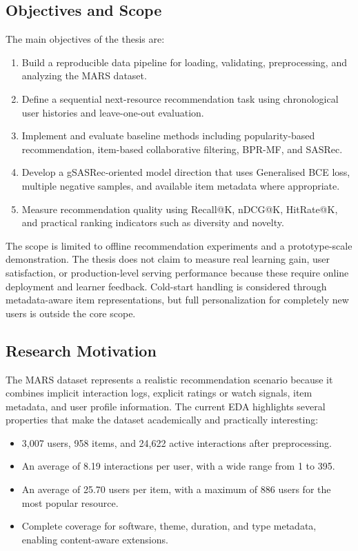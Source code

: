 \subsection{Objectives and Scope}

The main objectives of the thesis are:

\begin{enumerate}
    \item Build a reproducible data pipeline for loading, validating, preprocessing, and analyzing the MARS dataset.
    \item Define a sequential next-resource recommendation task using chronological user histories and leave-one-out evaluation.
    \item Implement and evaluate baseline methods including popularity-based recommendation, item-based collaborative filtering, BPR-MF, and SASRec.
    \item Develop a gSASRec-oriented model direction that uses Generalised BCE loss, multiple negative samples, and available item metadata where appropriate.
    \item Measure recommendation quality using Recall@K, nDCG@K, HitRate@K, and practical ranking indicators such as diversity and novelty.
\end{enumerate}

The scope is limited to offline recommendation experiments and a prototype-scale demonstration. The thesis does not claim to measure real learning gain, user satisfaction, or production-level serving performance because these require online deployment and learner feedback. Cold-start handling is considered through metadata-aware item representations, but full personalization for completely new users is outside the core scope.

\subsection{Research Motivation}

The MARS dataset represents a realistic recommendation scenario because it combines implicit interaction logs, explicit ratings or watch signals, item metadata, and user profile information. The current EDA highlights several properties that make the dataset academically and practically interesting:

\begin{itemize}
    \item 3,007 users, 958 items, and 24,622 active interactions after preprocessing.
    \item An average of 8.19 interactions per user, with a wide range from 1 to 395.
    \item An average of 25.70 users per item, with a maximum of 886 users for the most popular resource.
    \item Complete coverage for software, theme, duration, and type metadata, enabling content-aware extensions.
\end{itemize}

